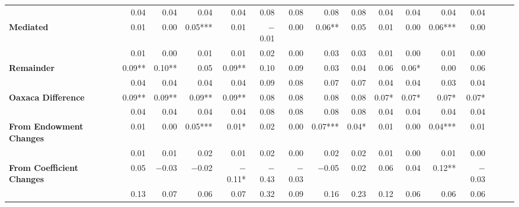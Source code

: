 \begin{tabular}{@{\extracolsep{5pt}}lrrrrrrrrrrrrrrr}
{\bf  } & 0.04\phantom{***} & 0.04\phantom{***} & 0.04\phantom{***} & 0.04\phantom{***} & 0.08\phantom{***} & 0.08\phantom{***} & 0.08\phantom{***} & 0.08\phantom{***} & 0.04\phantom{***} & 0.04\phantom{***} & 0.04\phantom{***} & 0.04\phantom{***} \\
{\bf Mediated} & 0.01\phantom{***} & 0.00\phantom{***} & 0.05*** & 0.01\phantom{***} & $-$0.01\phantom{***} & 0.00\phantom{***} & 0.06**\phantom{*} & 0.05\phantom{***} & 0.01\phantom{***} & 0.00\phantom{***} & 0.06*** & 0.00\phantom{***} \\
{\bf  } & 0.01\phantom{***} & 0.00\phantom{***} & 0.01\phantom{***} & 0.01\phantom{***} & 0.02\phantom{***} & 0.00\phantom{***} & 0.03\phantom{***} & 0.03\phantom{***} & 0.01\phantom{***} & 0.00\phantom{***} & 0.01\phantom{***} & 0.00\phantom{***} \\
{\bf Remainder} & 0.09**\phantom{*} & 0.10**\phantom{*} & 0.05\phantom{***} & 0.09**\phantom{*} & 0.10\phantom{***} & 0.09\phantom{***} & 0.03\phantom{***} & 0.04\phantom{***} & 0.06\phantom{***} & 0.06*\phantom{**} & 0.00\phantom{***} & 0.06\phantom{***} \\
{\bf  } & 0.04\phantom{***} & 0.04\phantom{***} & 0.04\phantom{***} & 0.04\phantom{***} & 0.09\phantom{***} & 0.08\phantom{***} & 0.07\phantom{***} & 0.07\phantom{***} & 0.04\phantom{***} & 0.04\phantom{***} & 0.03\phantom{***} & 0.04\phantom{***} \\
{\bf Oaxaca Difference} & 0.09**\phantom{*} & 0.09**\phantom{*} & 0.09**\phantom{*} & 0.09**\phantom{*} & 0.08\phantom{***} & 0.08\phantom{***} & 0.08\phantom{***} & 0.08\phantom{***} & 0.07*\phantom{**} & 0.07*\phantom{**} & 0.07*\phantom{**} & 0.07*\phantom{**} \\
{\bf  } & 0.04\phantom{***} & 0.04\phantom{***} & 0.04\phantom{***} & 0.04\phantom{***} & 0.08\phantom{***} & 0.08\phantom{***} & 0.08\phantom{***} & 0.08\phantom{***} & 0.04\phantom{***} & 0.04\phantom{***} & 0.04\phantom{***} & 0.04\phantom{***} \\
{\bf From Endowment Changes} & 0.01\phantom{***} & 0.00\phantom{***} & 0.05*** & 0.01*\phantom{**} & 0.02\phantom{***} & 0.00\phantom{***} & 0.07*** & 0.04*\phantom{**} & 0.01\phantom{***} & 0.00\phantom{***} & 0.04*** & 0.01\phantom{***} \\
{\bf  } & 0.01\phantom{***} & 0.01\phantom{***} & 0.02\phantom{***} & 0.01\phantom{***} & 0.02\phantom{***} & 0.00\phantom{***} & 0.02\phantom{***} & 0.02\phantom{***} & 0.01\phantom{***} & 0.00\phantom{***} & 0.01\phantom{***} & 0.00\phantom{***} \\
{\bf From Coefficient Changes} & 0.05\phantom{***} & $-$0.03\phantom{***} & $-$0.02\phantom{***} & $-$0.11*\phantom{**} & $-$0.43\phantom{***} & $-$0.03\phantom{***} & $-$0.05\phantom{***} & 0.02\phantom{***} & 0.06\phantom{***} & 0.04\phantom{***} & 0.12**\phantom{*} & $-$0.03\phantom{***} \\
{\bf  } & 0.13\phantom{***} & 0.07\phantom{***} & 0.06\phantom{***} & 0.07\phantom{***} & 0.32\phantom{***} & 0.09\phantom{***} & 0.16\phantom{***} & 0.23\phantom{***} & 0.12\phantom{***} & 0.06\phantom{***} & 0.06\phantom{***} & 0.06\phantom{***} \\
\hline
\end{tabular}
